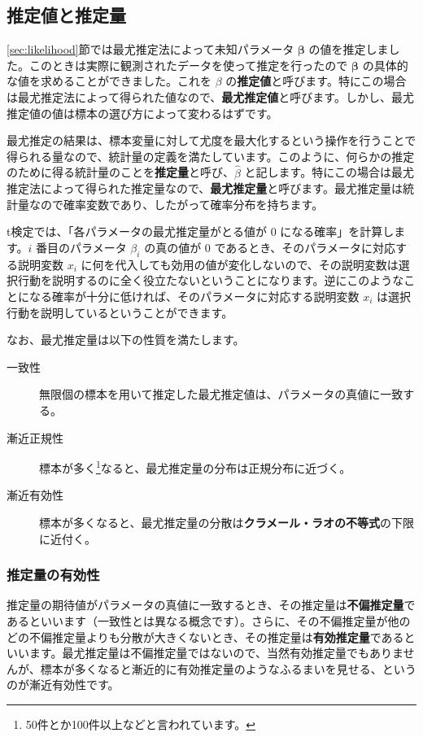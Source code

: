 \subsection{推定値と推定量}\label{ssec:estimator}

\ref{sec:likelihood}節では最尤推定法によって未知パラメータ $\bm\beta$ の値を推定しました。このときは実際に観測されたデータを使って推定を行ったので $\bm\beta$ の具体的な値を求めることができました。これを $\beta$ の\textbf{推定値}と呼びます。特にこの場合は最尤推定法によって得られた値なので、\textbf{最尤推定値}と呼びます。しかし、最尤推定値の値は標本の選び方によって変わるはずです。

最尤推定の結果は、標本変量に対して尤度を最大化するという操作を行うことで得られる量なので、統計量の定義を満たしています。このように、何らかの推定のために得る統計量のことを\textbf{推定量}と呼び、$\hat\beta$ と記します。特にこの場合は最尤推定法によって得られた推定量なので、\textbf{最尤推定量}と呼びます。最尤推定量は統計量なので確率変数であり、したがって確率分布を持ちます。

t検定では、「各パラメータの最尤推定量がとる値が $0$ になる確率」を計算します。$i$ 番目のパラメータ $\beta_i$ の真の値が $0$ であるとき、そのパラメータに対応する説明変数 $x_i$ に何を代入しても効用の値が変化しないので、その説明変数は選択行動を説明するのに全く役立たないということになります。逆にこのようなことになる確率が十分に低ければ、そのパラメータに対応する説明変数 $x_i$ は選択行動を説明しているということができます。

なお、最尤推定量は以下の性質を満たします。

\begin{description}
    \item[一致性] 無限個の標本を用いて推定した最尤推定値は、パラメータの真値に一致する。
    \item[漸近正規性] 標本が多く\footnote{50件とか100件以上などと言われています。}なると、最尤推定量の分布は正規分布に近づく。
    \item[漸近有効性] 標本が多くなると、最尤推定量の分散は\textbf{クラメール・ラオの不等式}の下限に近付く。
\end{description}

\subsubsection{推定量の有効性}

推定量の期待値がパラメータの真値に一致するとき、その推定量は\textbf{不偏推定量}であるといいます（一致性とは異なる概念です）。さらに、その不偏推定量が他のどの不偏推定量よりも分散が大きくないとき、その推定量は\textbf{有効推定量}であるといいます。最尤推定量は不偏推定量ではないので、当然有効推定量でもありませんが、標本が多くなると漸近的に有効推定量のようなふるまいを見せる、というのが漸近有効性です。

